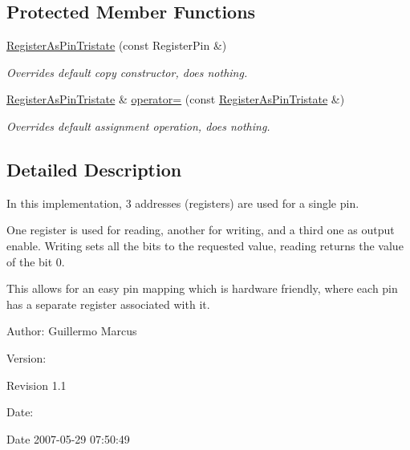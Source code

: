 \subsection*{Protected Member Functions}
\begin{CompactItemize}
\item 
\hyperlink{classmprace_1_1RegisterAsPinTristate_b0}{Register\-As\-Pin\-Tristate} (const Register\-Pin \&)
\begin{CompactList}\small\item\em Overrides default copy constructor, does nothing. \item\end{CompactList}\item 
\hyperlink{classmprace_1_1RegisterAsPinTristate}{Register\-As\-Pin\-Tristate} \& \hyperlink{classmprace_1_1RegisterAsPinTristate_b1}{operator=} (const \hyperlink{classmprace_1_1RegisterAsPinTristate}{Register\-As\-Pin\-Tristate} \&)
\begin{CompactList}\small\item\em Overrides default assignment operation, does nothing. \item\end{CompactList}\end{CompactItemize}


\subsection{Detailed Description}
In this implementation, 3 addresses (registers) are used for a single pin. 

One register is used for reading, another for writing, and a third one as output enable. Writing sets all the bits to the requested value, reading returns the value of the bit 0.

This allows for an easy pin mapping which is hardware friendly, where each pin has a separate register associated with it.

\begin{Desc}
\item[Author:]Guillermo Marcus \end{Desc}
\begin{Desc}
\item[Version:]\begin{Desc}
\item[Revision]1.1 \end{Desc}
\end{Desc}
\begin{Desc}
\item[Date:]\begin{Desc}
\item[Date]2007-05-29 07:50:49 \end{Desc}
\end{Desc}





